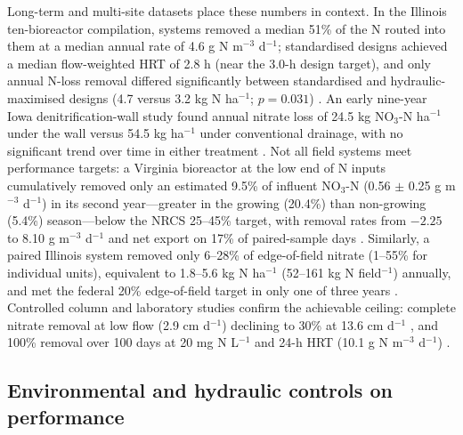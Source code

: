 Long-term and multi-site datasets place these numbers in context. In the Illinois ten-bioreactor compilation, systems removed a median 51\% of the N routed into them at a median annual rate of 4.6 g N m$^{-3}$ d$^{-1}$; standardised designs achieved a median flow-weighted HRT of 2.8 h (near the 3.0-h design target), and only annual N-loss removal differed significantly between standardised and hydraulic-maximised designs (4.7 versus 3.2 kg N ha$^{-1}$; $p=0.031$) \parencite{Christianson2026}. An early nine-year Iowa denitrification-wall study found annual nitrate loss of 24.5 kg NO$_3$-N ha$^{-1}$ under the wall versus 54.5 kg ha$^{-1}$ under conventional drainage, with no significant trend over time in either treatment \parencite{Moorman2010}. Not all field systems meet performance targets: a Virginia bioreactor at the low end of N inputs cumulatively removed only an estimated 9.5\% of influent NO$_3$-N (0.56 $\pm$ 0.25 g m$^{-3}$ d$^{-1}$) in its second year---greater in the growing (20.4\%) than non-growing (5.4\%) season---below the NRCS 25--45\% target, with removal rates from $-2.25$ to 8.10 g m$^{-3}$ d$^{-1}$ and net export on 17\% of paired-sample days \parencite{Bock2018}. Similarly, a paired Illinois system removed only 6--28\% of edge-of-field nitrate (1--55\% for individual units), equivalent to 1.8--5.6 kg N ha$^{-1}$ (52--161 kg N field$^{-1}$) annually, and met the federal 20\% edge-of-field target in only one of three years \parencite{Maxwell2022}. Controlled column and laboratory studies confirm the achievable ceiling: complete nitrate removal at low flow (2.9 cm d$^{-1}$) declining to 30\% at 13.6 cm d$^{-1}$ \parencite{Greenan2009}, and 100\% removal over 100 days at 20 mg N L$^{-1}$ and 24-h HRT (10.1 g N m$^{-3}$ d$^{-1}$) \parencite{Hua2016}.

\subsection{Environmental and hydraulic controls on performance}

